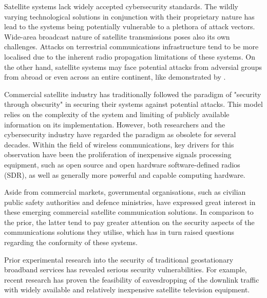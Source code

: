 \documentclass[english, 12pt, a4paper, elec, utf8, a-1b, online]{aaltothesis}
\begin{document}
Satellite systems lack widely accepted cybersecurity standards. \cite{lin2022defending} The wildly varying technological solutions in conjunction with their proprietary nature has lead to the systems being potentially vulnerable to a plethora of attack vectors. Wide-area broadcast nature of satellite transmissions poses also its own challenges. Attacks on terrestrial communications infrastructure tend to be more localised due to the inherent radio propagation limitations of these systems. On the other hand, satellite systems may face potential attacks from adversial groups from abroad or even across an entire continent, like demonstrated by \cite{pavur2020tale}.

Commercial satellite industry has traditionally followed the paradigm of "security through obscurity" in securing their systems against potential attacks. This model relies on the complexity of the system and limiting of publicly available information on its implementation. However, both researchers and the cybersecurity industry have regarded the paradigm as obsolete for several decades. Within the field of wireless communications, key drivers for this observation have been the proliferation of inexpensive signals processing equipment, such as open source and open hardware software-defined radios (SDR), as well as generally more powerful and capable computing hardware. %


Aside from commercial markets, governmental organisations, such as civilian public safety authorities and defence ministries, have expressed great interest in these emerging commercial satellite communication solutions. In comparison to the prior, the latter tend to pay greater attention on the security aspects of the communications solutions they utilise, which has in turn raised questions regarding the conformity of these systems.


Prior experimental research into the security of traditional geostationary broadband services has revealed serious security vulnerabilities. For example, recent research has proven the feasibility of eavesdropping of the downlink traffic with widely available and relatively inexpensive satellite television equipment. \cite{pavur2020tale} 

\end{document}
